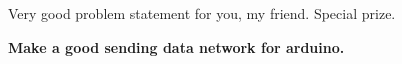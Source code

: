Very good problem statement for you, my friend. Special prize.

\textbf{Make a good sending data network for arduino.}